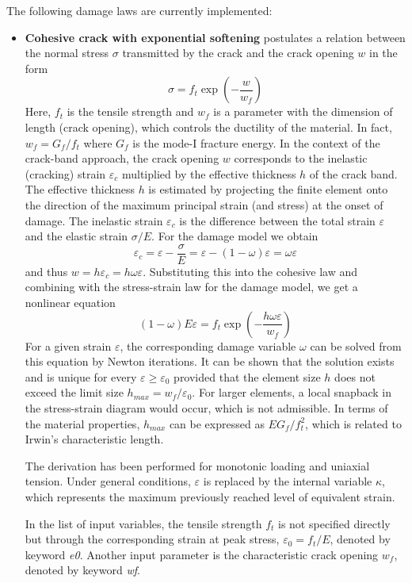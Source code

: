 \documentclass[a4paper]{article}
\begin{document}
The following damage laws are currently implemented:
\begin{itemize}
\item
{\bf Cohesive crack with exponential softening} postulates a relation
between the normal stress $\sigma$ transmitted by the crack and the
crack opening $w$ in the form
$$
\sigma = f_t\exp\left(-\frac{w}{w_f}\right)
$$
Here, $f_t$ is the tensile strength and $w_f$ is a parameter with the dimension
of length (crack opening), which controls the ductility of the material.
In fact, $w_f=G_f/f_t$ where $G_f$ is the mode-I fracture energy.
In the context of the crack-band approach, the crack opening $w$ corresponds
to the inelastic (cracking) strain $\varepsilon_c$ 
multiplied by the effective thickness $h$ of the 
crack band. The effective thickness $h$ is estimated by projecting the finite
element onto the direction of the maximum principal strain (and stress)
at the onset of damage. The inelastic strain $\varepsilon_c$
is the difference between
the total strain $\varepsilon$ and the elastic strain $\sigma/E$.
For the damage model we obtain
$$
\varepsilon_c = \varepsilon - \frac{\sigma}{E} =
\varepsilon - (1-\omega)\varepsilon = \omega\varepsilon
$$
and thus $w=h\varepsilon_c=h\omega\varepsilon$. Substituting this into
the cohesive law and combining with the stress-strain law for the damage
model, we get a nonlinear equation
$$
(1-\omega)E\varepsilon = f_t\exp\left(-\frac{h\omega\varepsilon}{w_f}\right)
$$
For a given strain $\varepsilon$, the corresponding damage variable $\omega$
can be solved from this equation by Newton iterations. 
It can be shown that the solution exists and is unique for every
$\varepsilon\ge\varepsilon_0$ provided that the element size $h$ does not
exceed the limit size $h_{max}=w_f/\varepsilon_0$. For larger elements,
a local snapback in the stress-strain diagram would occur, which is not
admissible. In terms of the material properties, $h_{max}$ can be expressed
as $EG_f/f_t^2$, which is related to Irwin's characteristic length.

The derivation
has been performed for monotonic loading and uniaxial tension. Under general
conditions, $\varepsilon$ is replaced by the internal variable $\kappa$,
which represents the maximum previously reached level of equivalent strain.

In the list of input variables, the tensile strength $f_t$ is not specified
directly but through the corresponding strain at peak stress, 
$\varepsilon_0=f_t/E$, denoted by keyword {\it e0}. Another input parameter
is the characteristic crack opening $w_f$, denoted by keyword {\it wf}.


\end{itemize}
\end{document}
